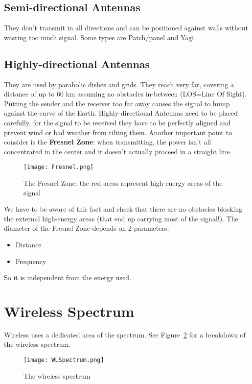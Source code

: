 \subsection{Semi-directional Antennas} They don't transmit in all 
directions and can be positioned against walls without wasting too much signal. 
Some types are Patch/panel and Yagi.

\subsection{Highly-directional Antennas} They are used by parabolic 
dishes and grids. They reach very far, covering a distance of up to 60 km 
assuming no obstacles in-between (LOS=Line Of Sight). Putting the sender and the 
receiver too far away causes the signal to hump against the curve of the Earth. 
Highly-directional Antennas need to be placed carefully, for the signal to be 
received they have to be perfectly aligned and prevent wind or bad weather from 
tilting them.
Another important point to consider is the \textbf{Fresnel Zone}: when 
transmitting, the power isn't all concentrated in the center and it doesn't 
actually proceed in a straight line.

\begin{figure}[h]
  \centering
  \texttt{[image: Fresnel.png]}
  \caption[The Fresnel Zone]{The Fresnel Zone: the red areas represent
    high-energy areas of the signal}				
  \label{fig:ewn:Fresnel}
\end{figure}

We have to be aware of this fact and check that there are no obstacles 
blocking the external high-energy areas (that end up carrying most of the 
signal!).
The diameter of the Fresnel Zone depends on 2 parameters:
\begin{itemize}
\item Distance
\item Frequency
\end{itemize}
So it is independent from the energy used.

\section{Wireless Spectrum}
Wireless uses a dedicated area of the spectrum. See
Figure~\ref{fig:ewn:WLSpectrum} for a breakdown of the wireless spectrum.

\begin{figure}[h]
  \centering
  \texttt{[image: WLSpectrum.png]}
  \caption{The wireless spectrum}				
  \label{fig:ewn:WLSpectrum}
\end{figure}	

